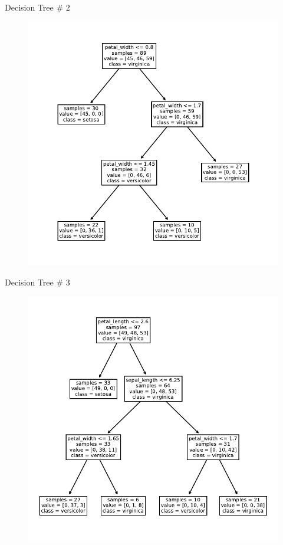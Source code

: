 \documentclass{beamer}
\begin{document}
\begin{frame}{Decision Tree \# 2}
  \begin{figure}
    \includegraphics[scale=0.7]{tree-2.pdf}
  \end{figure}
\end{frame}


\begin{frame}{Decision Tree \# 3}
  \begin{figure}
    \includegraphics[scale=0.7]{tree-3.pdf}
  \end{figure}
\end{frame}
\end{document}
